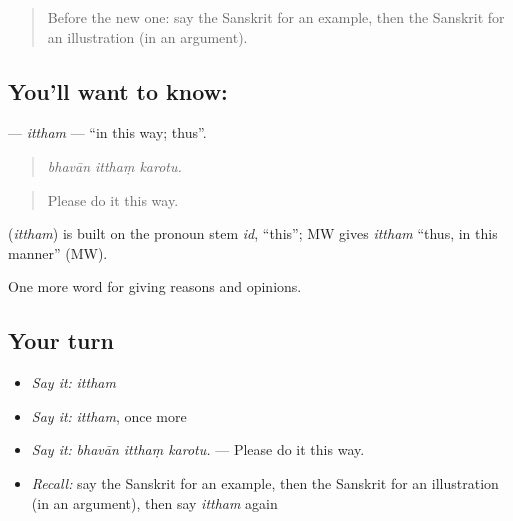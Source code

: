 \label{lesson:SA-C347-ittham}



\begin{quote}
Before the new one: say the Sanskrit for an example, then the Sanskrit for an illustration (in an argument).
\end{quote}

\subsection*{You'll want to know: }
\textbf{} — \emph{ittham} — \textquotedblleft{}in this way; thus\textquotedblright{}.

\begin{quote}
  
\end{quote}

\begin{quote}
\emph{bhavān itthaṃ karotu.}
\end{quote}

\begin{quote}
Please do it this way.
\end{quote}

\begin{cousinweb}
\textbf{} (\emph{ittham}) is built on the pronoun stem \emph{id}, \textquotedblleft{}this\textquotedblright{}; MW gives \emph{ittham} \textquotedblleft{}thus, in this manner\textquotedblright{} (MW).
\end{cousinweb}

\begin{grammarlens}[title={What you've built}]
One more word for giving reasons and opinions.
\end{grammarlens}

\subsection*{Your turn}
\begin{itemize}
\raggedright
  \item \emph{Say it:} \emph{ittham}
  \item \emph{Say it:} \emph{ittham}, once more
  \item \emph{Say it:} \emph{bhavān itthaṃ karotu.} — Please do it this way.
  \item \emph{Recall:} say the Sanskrit for an example, then the Sanskrit for an illustration (in an argument), then say \emph{ittham} again
\end{itemize}

